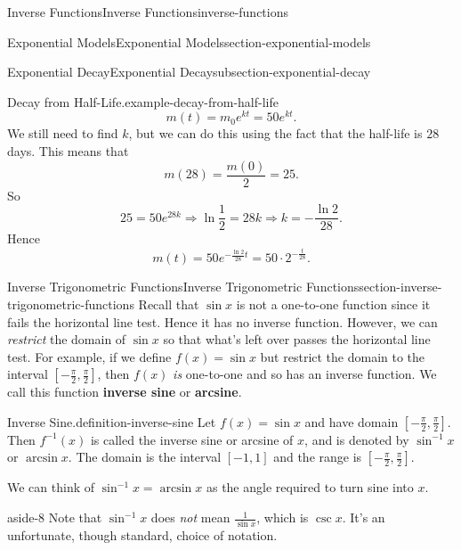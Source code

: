 \documentclass[oneside,10pt,]{book}
\newcommand{\terminology}[1]{\textbf{#1}}
\numberwithin{equation}{section}
\begin{document}
\begin{chapterptx}{Inverse Functions}{}{Inverse Functions}{}{}{inverse-functions}
\begin{sectionptx}{Exponential Models}{}{Exponential Models}{}{}{section-exponential-models}
\begin{subsectionptx}{Exponential Decay}{}{Exponential Decay}{}{}{subsection-exponential-decay}
\begin{example}{Decay from Half-Life.}{example-decay-from-half-life}
\begin{equation*}
m(t) = m_{0}e^{kt} = 50e^{kt}.
\end{equation*}
We still need to find \(k\), but we can do this using the fact that the half-life is \(28\) days. This means that%
\begin{equation*}
m(28) = \frac{m(0)}{2} = 25.
\end{equation*}
So%
\begin{equation*}
25 = 50e^{28k}\Rightarrow \ln\frac{1}{2} = 28k\Rightarrow k = -\frac{\ln2}{28}.
\end{equation*}
Hence%
\begin{equation*}
m(t) = 50e^{-\frac{\ln2}{28}t} = 50\cdot2^{-\frac{t}{28}}.
\end{equation*}
%
\end{example}
\end{subsectionptx}
\end{sectionptx}
%
%
\typeout{************************************************}
\typeout{************************************************}
%
\begin{sectionptx}{Inverse Trigonometric Functions}{}{Inverse Trigonometric Functions}{}{}{section-inverse-trigonometric-functions}
\hypertarget{p-257}{}%
Recall that \(\sin x\) is not a one-to-one function since it fails the horizontal line test. Hence it has no inverse function. However, we can \emph{restrict} the domain of \(\sin x\) so that what's left over passes the horizontal line test. For example, if we define \(f(x) = \sin x\) but restrict the domain to the interval \([-\frac{\pi}{2},\frac{\pi}{2}]\), then \(f(x)\) \emph{is} one-to-one and so has an inverse function. We call this function \terminology{inverse sine} or \terminology{arcsine}.%
\begin{definition}{Inverse Sine.}{definition-inverse-sine}%
\hypertarget{p-258}{}%
Let \(f(x) = \sin x\) and have domain \([-\frac{\pi}{2},\frac{\pi}{2}]\). Then \(f^{-1}(x)\) is called the inverse sine or arcsine of \(x\), and is denoted by \(\sin^{-1}x\) or \(\arcsin x\). The domain is the interval \([-1,1]\) and the range is \([-\frac{\pi}{2},\frac{\pi}{2}]\).%
\end{definition}
\hypertarget{p-259}{}%
We can think of \(\sin^{-1}x = \arcsin x\) as the angle required to turn sine into \(x\). \begin{aside}{}{aside-8}%
\hypertarget{p-260}{}%
Note that \(\sin^{-1}x\) does \emph{not} mean \(\frac{1}{\sin x}\), which is \(\csc x\). It's an unfortunate, though standard, choice of notation.%

\end{aside}
\end{sectionptx}
\end{chapterptx}
\end{document}
